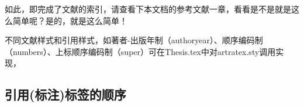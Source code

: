 \documentclass[twoside]{article}
\begin{document}
如此，即完成了文献的索引，请查看下本文档的参考文献一章，看看是不是就是这么简单呢？是的，就是这么简单！

不同文献样式和引用样式，如著者-出版年制（authoryear）、顺序编码制（numbers）、上标顺序编码制（super）可在Thesis.tex中对artratex.sty调用实现，


\subsection{引用(标注)标签的顺序}

\cite{chen1980zhongguo,stamerjohanns2009mathml,hls2012jinji,niu2013zonghe}

\cite{hls2012jinji,niu2013zonghe,chen1980zhongguo,stamerjohanns2009mathml}


    \printbibliography

    
\end{document}
